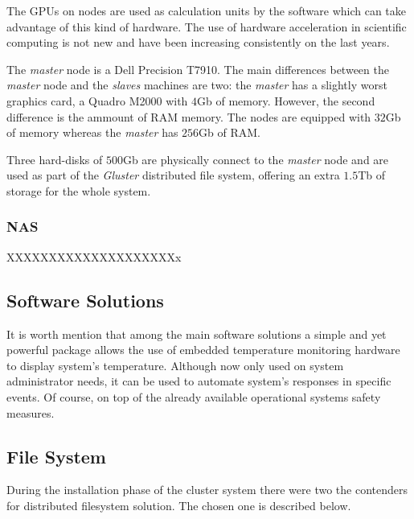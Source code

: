\documentclass[twoside,a4paper,12pt,english]{inac19}
\begin{document}
The GPUs on nodes are used as calculation units by the software which can take advantage of this kind of hardware.
The use of hardware acceleration in scientific computing is not new and have been increasing consistently on the
last years\cite{accelerators}.

The \textit{master} node is a Dell Precision T7910. The main
differences between the \textit{master} node and the \textit{slaves} machines are two: the \textit{master} has
a slightly worst graphics card, a Quadro{\textregistered} M2000 with $4$Gb of memory. However, the second difference
is the ammount of RAM memory. The nodes are equipped with $32$Gb of memory whereas the \textit{master} has
$256$Gb of RAM.


Three hard-disks of $500$Gb are physically connect to the \textit{master} node and are used as part of the 
\textit{Gluster} distributed file system, offering
an extra $1.5$Tb of storage for the whole system.



\subsubsection{NAS}

XXXXXXXXXXXXXXXXXXXXx

\subsection{Software Solutions}
\label{sub:ssol}


It is worth mention that among the main software solutions a simple and yet powerful package 
allows the use of embedded temperature monitoring hardware to display system's temperature. 
Although now only used on system administrator needs, it can be used to automate system's 
responses in specific events. Of course, on top of the already available operational systems 
safety measures. 

\subsection{File System}

During the installation phase of the cluster system\cite{cluster17} there were two the contenders for
distributed filesystem solution. The chosen one is described below.
\end{document}

